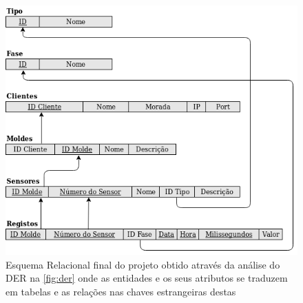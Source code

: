 \documentclass[11pt,twoside,a4paper]{report}
\begin{document}
\begin{figure}[H]
	\begin{center}
		\includegraphics[width=1\textwidth]{esquema_relacional} %
		\caption[Esquema Relacional final do projeto]{Esquema Relacional final do projeto obtido através da análise do DER na \autoref{fig:der} onde as entidades e os seus atributos se traduzem em tabelas e as relações nas chaves estrangeiras destas}
		\label{fig:er}
	\end{center}
\end{figure}

\newpage
\end{document}
